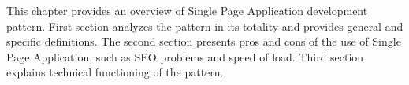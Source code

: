 This chapter provides an overview of Single Page Application development pattern. First section analyzes the pattern in its totality and provides general and specific definitions. The second section presents pros and cons of the use of Single Page Application, such as SEO problems and speed of load. Third section explains technical functioning of the pattern. 
